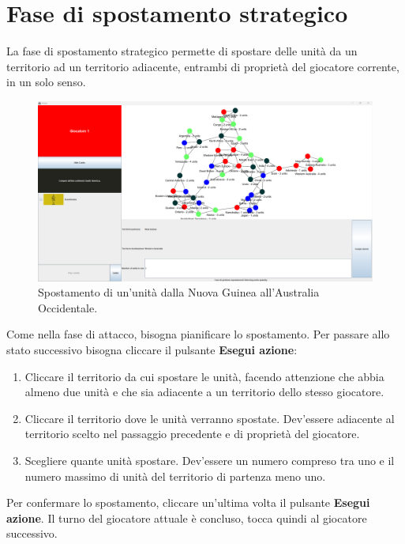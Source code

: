 \documentclass[a4paper,12pt]{report}
\begin{document}
\section{Fase di spostamento strategico}
La fase di spostamento strategico permette di spostare delle unità da un territorio ad un territorio adiacente, entrambi di proprietà del giocatore corrente, in un solo senso.

\begin{figure}[H]
	\centering
	\includegraphics[width=1\textwidth]{user_guide/12_final_move_before.png}
	\caption{Spostamento di un'unità dalla Nuova Guinea all'Australia Occidentale.}
\end{figure}

Come nella fase di attacco, bisogna pianificare lo spostamento. Per passare allo stato successivo bisogna cliccare il pulsante \textbf{Esegui azione}:
\begin{enumerate}
	\item Cliccare il territorio da cui spostare le unità, facendo attenzione che abbia almeno due unità e che sia adiacente a un territorio dello stesso giocatore.
	\item Cliccare il territorio dove le unità verranno spostate. Dev'essere adiacente al territorio scelto nel passaggio precedente e di proprietà del giocatore.
	\item Scegliere quante unità spostare. Dev'essere un numero compreso tra uno e il numero massimo di unità del territorio di partenza meno uno.
\end{enumerate}

Per confermare lo spostamento, cliccare un'ultima volta il pulsante \textbf{Esegui azione}.
Il turno del giocatore attuale è concluso, tocca quindi al giocatore successivo.
\end{document}
